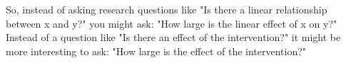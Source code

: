 \documentclass[]{report}\usepackage[]{graphicx}\usepackage[]{color}
\begin{document}
%
%
%
%





So, instead of asking research questions like "Is there a linear relationship between x and y?" you might ask: "How large is the linear effect of x on y?" Instead of a question like "Is there an effect of the intervention?" it might be more interesting to ask: "How large is the effect of the intervention?"
\end{document}
